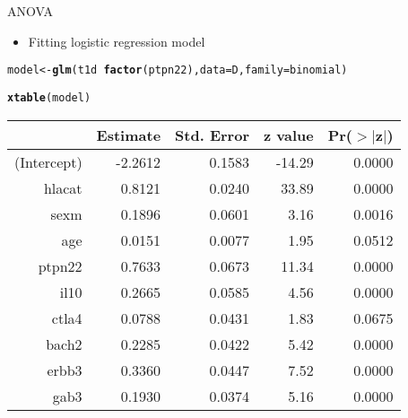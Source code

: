 \documentclass{beamer}
\makeatletter
\newcommand{\hlopt}[1]{\textcolor[rgb]{0,0,0}{#1}}%
\newcommand{\hlstd}[1]{\textcolor[rgb]{0.345,0.345,0.345}{#1}}%
\newcommand{\hlkwb}[1]{\textcolor[rgb]{0.69,0.353,0.396}{#1}}%
\newcommand{\hlkwc}[1]{\textcolor[rgb]{0.333,0.667,0.333}{#1}}%
\newcommand{\hlkwd}[1]{\textcolor[rgb]{0.737,0.353,0.396}{\textbf{#1}}}%
\newenvironment{kframe}{%
 \def\at@end@of@kframe{}%
 \ifinner\ifhmode%
  \def\at@end@of@kframe{\end{minipage}}%
  \begin{minipage}{\columnwidth}%
 \fi\fi%
 \def\FrameCommand##1{\hskip\@totalleftmargin \hskip-\fboxsep
 \colorbox{shadecolor}{##1}\hskip-\fboxsep
     \hskip-\linewidth \hskip-\@totalleftmargin \hskip\columnwidth}%
 \MakeFramed {\advance\hsize-\width
   \@totalleftmargin\z@ \linewidth\hsize
   \@setminipage}}%
 {\par\unskip\endMakeFramed%
 \at@end@of@kframe}
\makeatother
\begin{document}
\begin{frame}[fragile]{ANOVA}
  \begin{itemize}
    \item Fitting logistic regression model
  \end{itemize}
\begin{kframe}
\begin{alltt}
\hlstd{model} \hlkwb{<-} \hlkwd{glm}\hlstd{(t1d} \hlopt{~} \hlkwd{factor}\hlstd{(ptpn22),} \hlkwc{data}\hlstd{=D,} \hlkwc{family}\hlstd{=binomial)}
\end{alltt}


{\ttfamily\noindent\bfseries\color{errorcolor}{\#\# Error: object 't1d' not found}}\begin{alltt}
\hlkwd{xtable}\hlstd{(model)}
\end{alltt}
\end{kframe}%
\begin{table}[ht]
\centering
\begin{tabular}{rrrrr}
  \hline
 & Estimate & Std. Error & z value & Pr($>$$|$z$|$) \\ 
  \hline
(Intercept) & -2.2612 & 0.1583 & -14.29 & 0.0000 \\ 
  hlacat & 0.8121 & 0.0240 & 33.89 & 0.0000 \\ 
  sexm & 0.1896 & 0.0601 & 3.16 & 0.0016 \\ 
  age & 0.0151 & 0.0077 & 1.95 & 0.0512 \\ 
  ptpn22 & 0.7633 & 0.0673 & 11.34 & 0.0000 \\ 
  il10 & 0.2665 & 0.0585 & 4.56 & 0.0000 \\ 
  ctla4 & 0.0788 & 0.0431 & 1.83 & 0.0675 \\ 
  bach2 & 0.2285 & 0.0422 & 5.42 & 0.0000 \\ 
  erbb3 & 0.3360 & 0.0447 & 7.52 & 0.0000 \\ 
  gab3 & 0.1930 & 0.0374 & 5.16 & 0.0000 \\ 
   \hline
\end{tabular}
\end{table}

\end{frame}
\end{document}
